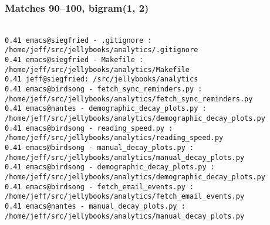 \begin{frame}
\frametitle{Matches 90--100, bigram(1, 2)}
  \tt\tiny
{}\\[2mm]
\hspace{2mm}0.41 emacs@siegfried - .gitignore : /home/jeff/src/jellybooks/analytics/.gitignore\\
\hspace{2mm}0.41 emacs@siegfried - Makefile : /home/jeff/src/jellybooks/analytics/Makefile\\
\hspace{2mm}0.41 jeff@siegfried:~/src/jellybooks/analytics\\
\hspace{2mm}0.41 emacs@birdsong - fetch\_sync\_reminders.py : /home/jeff/src/jellybooks/analytics/fetch\_sync\_reminders.py\\
\hspace{2mm}0.41 emacs@nantes - demographic\_decay\_plots.py : /home/jeff/src/jellybooks/analytics/demographic\_decay\_plots.py\\
\hspace{2mm}0.41 emacs@birdsong - reading\_speed.py : /home/jeff/src/jellybooks/analytics/reading\_speed.py\\
\hspace{2mm}0.41 emacs@birdsong - manual\_decay\_plots.py : /home/jeff/src/jellybooks/analytics/manual\_decay\_plots.py\\
\hspace{2mm}0.41 emacs@birdsong - demographic\_decay\_plots.py : /home/jeff/src/jellybooks/analytics/demographic\_decay\_plots.py\\
\hspace{2mm}0.41 emacs@birdsong - fetch\_email\_events.py : /home/jeff/src/jellybooks/analytics/fetch\_email\_events.py\\
\hspace{2mm}0.41 emacs@nantes - manual\_decay\_plots.py : /home/jeff/src/jellybooks/analytics/manual\_decay\_plots.py
\end{frame}


